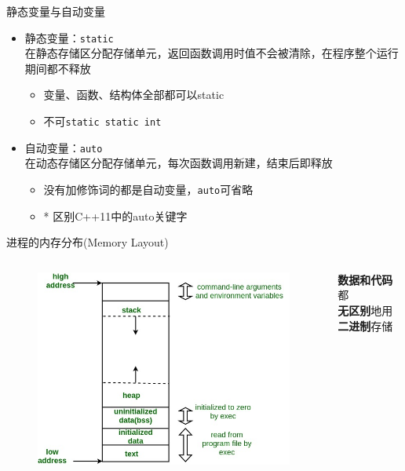 \documentclass{myslide}
\begin{document}
\begin{frame}[fragile]{静态变量与自动变量}
\begin{itemize}
	\item 静态变量：\verb'static'\\
	在静态存储区分配存储单元，返回函数调用时值不会被清除，在程序整个运行期间都不释放
	\begin{itemize}
		\item 变量、函数、结构体全部都可以static
		\item 不可\verb'static static int'
	\end{itemize}
	\item 自动变量：\verb'auto'\\
	在动态存储区分配存储单元，每次函数调用新建，结束后即释放
	\begin{itemize}
		\item 没有加修饰词的都是自动变量，\verb'auto'可省略
		\item * 区别C++11中的auto关键字
	\end{itemize}
\end{itemize}
\end{frame}

\begin{frame}[fragile]{进程的内存分布(Memory Layout)}
\begin{columns}
\begin{column}{0.6\linewidth}
\begin{figure}
\centering
\includegraphics[width=\linewidth]{fig/memoryLayoutC.jpg}
\end{figure}
\end{column}
\begin{column}{0.4\linewidth}
\begin{center}
\textbf{数据和代码}都\\
\textbf{无区别}地用\textbf{二进制}存储
\end{center}
\end{column}
\end{columns}
\end{frame}
\end{document}
